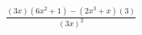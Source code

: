\documentclass[preview]{standalone}
\begin{document}
\begin{align*}
\frac{(3x)(6x^2+1)-(2x^3+x)(3)}{(3x)^2}
\end{align*}
\end{document}
